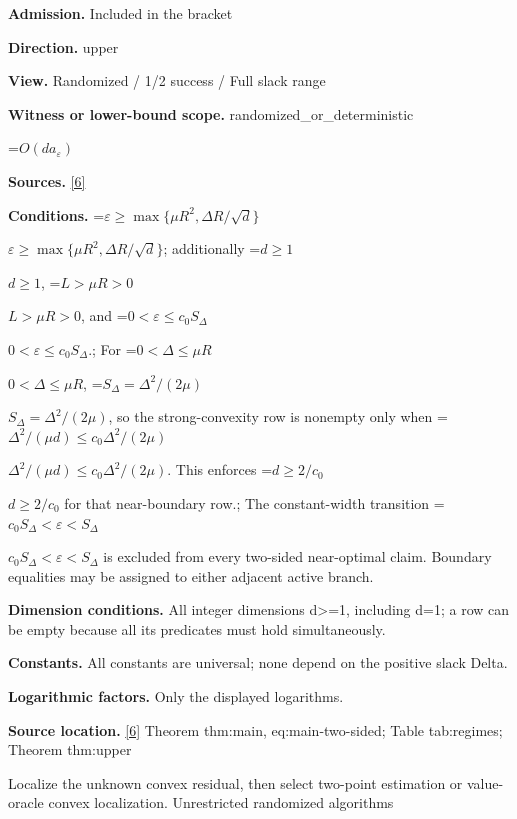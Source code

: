 \documentclass[10pt,a4paper]{article}
\newcommand{\AtlasMath}[1]{\par\begingroup\centering\setbox0=\hbox{$\displaystyle #1$}\ifdim\wd0>1.4\linewidth\typeout{ATLAS WIDE FORMULA: \the\wd0}\fi\ifdim\wd0>\linewidth\resizebox{\linewidth}{!}{\box0}\else\box0\fi\par\endgroup}
\newcommand{\AtlasInlineMath}[1]{\begingroup\setbox0=\hbox{$#1$}\ifdim\wd0>.4\linewidth\endgroup\AtlasMath{#1}\else\endgroup$#1$\fi}
\begin{document}
\textbf{Admission.} Included in the bracket



\textbf{Direction.} upper



\textbf{View.} Randomized / 1/2 success / Full slack range



\textbf{Witness or lower-bound scope.} randomized\_or\_deterministic



\AtlasMath{O(da_\varepsilon)}


\textbf{Sources.} \href{https://github.com/WU-Wendao/Colombo/blob/main/colombo_sensorium/Complexity_altas/data/sources/colombo/U10/manuscript.pdf}{[6]}



\textbf{Conditions.} \AtlasInlineMath{\varepsilon\ge\max\{\mu R^2,\Delta R/\sqrt d\}}; additionally \AtlasInlineMath{d\ge1}, \AtlasInlineMath{L>\mu R>0}, and \AtlasInlineMath{0<\varepsilon\le c_0S_\Delta}.; For \AtlasInlineMath{0<\Delta\le\mu R}, \AtlasInlineMath{S_\Delta=\Delta^2/(2\mu)}, so the strong-convexity row is nonempty only when \AtlasInlineMath{\Delta^2/(\mu d)\le c_0\Delta^2/(2\mu)}. This enforces \AtlasInlineMath{d\ge2/c_0} for that near-boundary row.; The constant-width transition \AtlasInlineMath{c_0S_\Delta<\varepsilon<S_\Delta} is excluded from every two-sided near-optimal claim. Boundary equalities may be assigned to either adjacent active branch.



\textbf{Dimension conditions.} All integer dimensions d>=1, including d=1; a row can be empty because all its predicates must hold simultaneously.



\textbf{Constants.} All constants are universal; none depend on the positive slack Delta.



\textbf{Logarithmic factors.} Only the displayed logarithms.



\textbf{Source location.} \href{https://github.com/WU-Wendao/Colombo/blob/main/colombo_sensorium/Complexity_altas/data/sources/colombo/U10/manuscript.pdf}{[6]} Theorem thm:main, eq:main-two-sided; Table tab:regimes; Theorem thm:upper



Localize the unknown convex residual, then select two-point estimation or value-oracle convex localization. Unrestricted randomized algorithms
\end{document}

